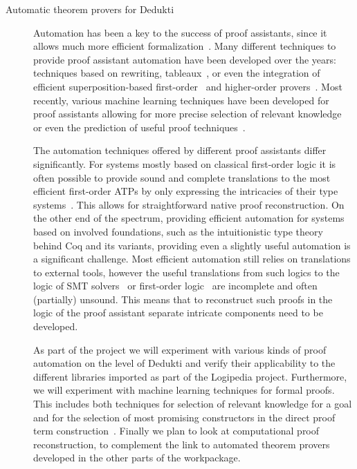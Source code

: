 \begin{description}
\item[Automatic theorem provers for Dedukti]

  Automation has been a key to the success of proof assistants, since it
  allows much more efficient formalization~\cite{Hales-Developments}.
  Many different techniques to provide proof assistant automation have
  been developed over the years: techniques based on rewriting,
  tableaux~\cite{Paulson-blast}, or even the integration of efficient
  superposition-based first-order~\cite{hurd-metis} and higher-order
  provers~\cite{asperti-matita-paramodulation}. Most recently, various
  machine learning techniques have been developed for proof assistants
  allowing for more precise selection of relevant
  knowledge~\cite{blanchette-h4qed-jfr} or even the prediction of useful
  proof techniques~\cite{gauthier-tactictoe}.

  The automation techniques offered by different proof assistants differ
  significantly. For systems mostly based on classical first-order logic
  it is often possible to provide sound and complete translations to the
  most efficient first-order ATPs by only expressing the intricacies of
  their type systems~\cite{kaliszyk-miz40}. This allows for
  straightforward native proof reconstruction. On the other end of the
  spectrum, providing efficient automation for systems based on involved
  foundations, such as the intuitionistic type theory behind Coq and its
  variants, providing even a slightly useful automation is a significant
  challenge. Most efficient automation still relies on translations to
  external tools, however the useful translations from such logics to
  the logic of SMT solvers~\cite{DBLP:conf/cpp/ArmandFGKTW11} or
  first-order logic~\cite{DBLP:journals/jar/CzajkaK18} are incomplete
  and often (partially) unsound. This means that to reconstruct such
  proofs in the logic of the proof assistant separate intricate
  components need to be developed.

  As part of the project we will experiment with various kinds of proof
  automation on the level of Dedukti and verify their applicability to
  the different libraries imported as part of the Logipedia project.
  Furthermore, we will experiment with machine learning techniques for
  formal proofs. This includes both techniques for selection of relevant
  knowledge for a goal and for the selection of most promising
  constructors in the direct proof term
  construction~\cite{ZielenkiewiczSchubert2016}. Finally we plan to look
  at computational proof reconstruction, to complement the link to
  automated theorem provers developed in the other parts of the
  workpackage.


\end{description}
